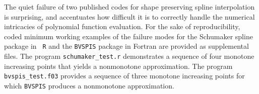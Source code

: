 
\beginred


The quiet failure of two published codes for shape preserving spline
interpolation is surprising, and accentuates how difficult it is to
correctly handle the numerical intricacies of polynomial function
evaluation. For the sake of reproducibility, coded minimum working
examples of the failure modes for the Schumaker spline package in {\tt
  R} and the {\tt BVSPIS} package in Fortran are provided as
supplemental files. The program {\tt schumaker\_test.r} demonstrates a
sequence of four monotone increasing points that yields a nonmonotone
approximation. The program {\tt bvspis\_test.f03} provides a sequence
of three monotone increasing points for which {\tt BVSPIS} produces a
nonmonotone approximation.

\endred
